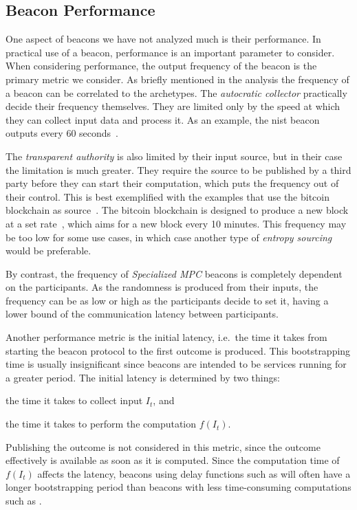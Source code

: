 \subsection{Beacon Performance}
One aspect of beacons we have not analyzed much is their performance.
In practical use of a beacon, performance is an important parameter to consider.
When considering performance, the output frequency of the beacon is the primary metric we consider.
As briefly mentioned in the analysis the frequency of a beacon can be correlated to the archetypes.
The \emph{autocratic collector} practically decide their frequency themselves.
They are limited only by the speed at which they can collect input data and process it.
As an example, the \gls{nist} beacon outputs every 60 seconds~\cite{nistbeacon}.

The \emph{transparent authority} is also limited by their input source, but in their case the limitation is much greater.
They require the source to be published by a third party before they can start their computation, which puts the frequency out of their control.
This is best exemplified with the examples that use the bitcoin blockchain as source~\cite{bonneau2015bitcoin, bentov2016bitcoin, bunz2017proofsof}.
The bitcoin blockchain is designed to produce a new block at a set rate~\cite{nakamoto2008bitcoin}, which aims for a new block every 10 minutes.
This frequency may be too low for some use cases, in which case another type of \emph{entropy sourcing} would be preferable.

By contrast, the frequency of \emph{Specialized MPC} beacons is completely dependent on the participants.
As the randomness is produced from their inputs, the frequency can be as low or high as the participants decide to set it, having a lower bound of the communication latency between participants.

Another performance metric is the initial latency, i.e.\ the time it takes from starting the beacon protocol to the first outcome is produced.
This bootstrapping time is usually insignificant since beacons are intended to be services running for a greater period.
The initial latency is determined by two things:
\begin{eromanate*}
    \item the time it takes to collect input $I_t$, and
    \item the time it takes to perform the computation $f(I_t)$.
\end{eromanate*}
Publishing the outcome is not considered in this metric, since the outcome effectively is available as soon as it is computed.
Since the computation time of $f(I_t)$ affects the latency, beacons using delay functions such as  will often have a longer bootstrapping period than beacons with less time-consuming computations such as .
